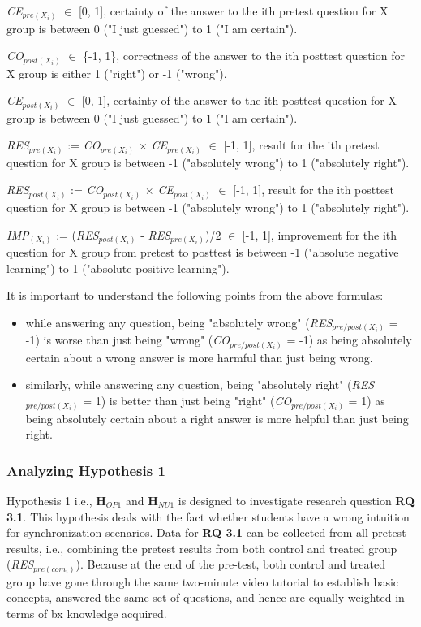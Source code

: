 \textit{CE$_{pre(X_i)}$} $\in$ [0, 1], certainty of the answer to the ith pretest question for X group is between 0 ("I just guessed") to 1 ("I am certain").

\textit{CO$_{post(X_i)}$} $\in$ \{-1, 1\}, correctness of the answer to the ith posttest question for X group is either 1 ("right") or -1  ("wrong").

\textit{CE$_{post(X_i)}$} $\in$ [0, 1], certainty of the answer to the ith posttest question for X group is between 0 ("I just guessed") to 1 ("I am certain").

\textit{RES$_{pre(X_i)}$} := \textit{CO$_{pre(X_i)}$} $\times$ \textit{CE$_{pre(X_i)}$} $\in$ [-1,  1], result for the ith pretest question for X group is between -1 ("absolutely wrong") to 1 ("absolutely right").

\textit{RES$_{post(X_i)}$} := \textit{CO$_{post(X_i)}$} $\times$ \textit{CE$_{post(X_i)}$} $\in$ [-1,  1], result for the ith posttest question for X group is between -1 ("absolutely wrong") to 1 ("absolutely right").

\textit{IMP$_{(X_i)}$} := (\textit{RES$_{post(X_i)}$} - \textit{RES$_{pre(X_i)}$})/2 $\in$ [-1,  1], improvement for the ith question for X group from pretest to posttest is between -1 ("absolute negative learning") to 1 ("absolute positive learning").

It is important to understand the following points from the above formulas:
\begin{itemize}
	\item while answering any question, being "absolutely wrong" (\textit{RES$_{pre/post(X_i)}$} = -1) is worse than just being "wrong" (\textit{CO$_{pre/post(X_i)}$} = -1) as being absolutely certain about a wrong answer is more harmful than just being wrong.
	\item similarly, while answering any question, being "absolutely right" (\textit{RES$_{pre/post(X_i)}$} = 1) is better than just being "right" (\textit{CO$_{pre/post(X_i)}$} = 1) as being absolutely certain about a right answer is more helpful than just being right.
\end{itemize} 

\subsubsection{Analyzing Hypothesis 1}\label{subsubsec:hypothesis1}
Hypothesis 1 i.e., \textbf{H$_{OP1}$} and \textbf{H$_{NU1}$} is designed to investigate research question \textbf{RQ 3.1}. This hypothesis deals with the fact whether students have a wrong intuition for synchronization scenarios. Data for \textbf{RQ 3.1} can be collected from all pretest results, i.e., combining the pretest results from both control and treated group (\textit{RES$_{pre(com_i)}$}). Because at the end of the pre-test, both control and treated group have gone through the same two-minute video tutorial to establish basic concepts, answered the same set of questions, and hence are equally weighted in terms of bx knowledge acquired.


